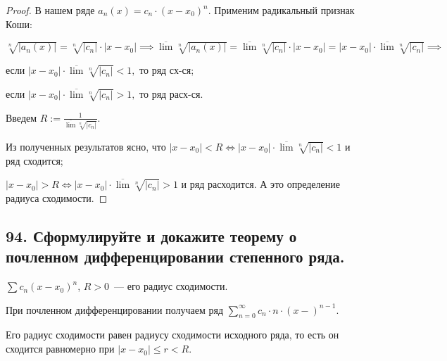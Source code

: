 \documentclass[a4paper, fleqn]{article}
\begin{document}
        \begin{proof} 
        В нашем ряде $a_n(x) = c_n \cdot (x - x_0)^n.$ Применим радикальный признак Коши: 
        
        $\sqrt[n]{|a_n(x)|} = \sqrt[n]{|c_n|} \cdot |x - x_0| \implies
        \overline{\lim} \sqrt[n]{|a_n(x)|} = \overline{\lim} \sqrt[n]{|c_n|} \cdot |x - x_0| =
        |x - x_0| \cdot \overline{\lim} \sqrt[n]{|c_n|} \implies $ 
        
        если $|x - x_0| \cdot \overline{\lim} \sqrt[n]{|c_n|} < 1,$ то ряд сх-ся;
        
        если $|x - x_0| \cdot \overline{\lim} \sqrt[n]{|c_n|} > 1,$ то ряд расх-ся.
        
        Введем $R := \frac{1}{\overline{\lim} \sqrt[n]{|c_n|}}.$
        
        Из полученных результатов ясно, что $|x - x_0| < R \iff |x - x_0| \cdot \overline{\lim} \sqrt[n]{|c_n|} < 1$ и ряд сходится; 
        
        $|x - x_0| > R \iff |x - x_0| \cdot \overline{\lim} \sqrt[n]{|c_n|} > 1$ и ряд расходится. А это определение радиуса сходимости.
        
        \end{proof}
        
        
    
        
        
        
        
    \subsection*{94. Сформулируйте и докажите теорему о почленном дифференцировании степенного ряда.}
    \begin{theorem}
        $\sum c_n\left(x - x_0\right)^n$, $R > 0$~--- его радиус сходимости.

        При почленном дифференцировании получаем ряд $\sum_{n=0}^\infty c_n \cdot n \cdot \left(x - \right)^{n - 1}$.

        Его радиус сходимости равен радиусу сходимости исходного ряда, то есть он сходится равномерно при $\left|x - x_0\right| \leq r < R$.
    \end{theorem}
        
\end{document}
